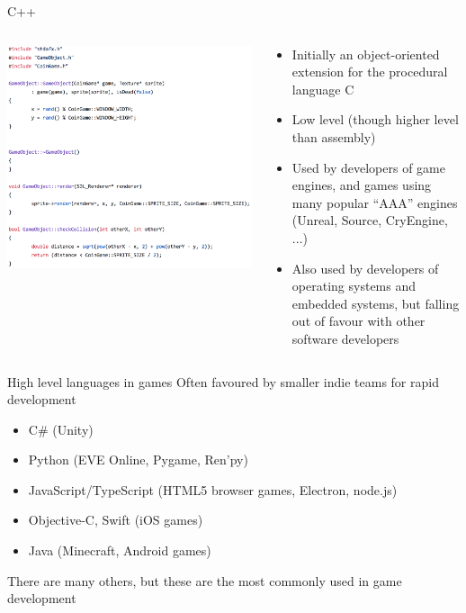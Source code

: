 \begin{frame}{C++}
	\begin{columns}
		\begin{column}{0.35\textwidth}
			\includegraphics[width=\textwidth]{cplusplus}
		\end{column}
		\begin{column}{0.65\textwidth}
			\begin{itemize}
				\pause\item Initially an object-oriented extension for the procedural language C
				\pause\item Low level (though higher level than assembly)
				\pause\item Used by developers of game engines,
					and games using many popular ``AAA'' engines (Unreal, Source, CryEngine, ...)
				\pause\item Also used by developers of operating systems and embedded systems,
					but falling out of favour with other software developers
			\end{itemize}
		\end{column}
	\end{columns}
\end{frame}

\begin{frame}{High level languages in games}
	\pause Often favoured by smaller indie teams for rapid development
	\begin{itemize}
		\pause\item C\# (Unity)
		\pause\item Python (EVE Online, Pygame, Ren'py)
		\pause\item JavaScript/TypeScript (HTML5 browser games, Electron, node.js)
		\pause\item Objective-C, Swift (iOS games)
		\pause\item Java (Minecraft, Android games)
	\end{itemize}
	\pause There are many others, but these are the most commonly used in game development
\end{frame}

